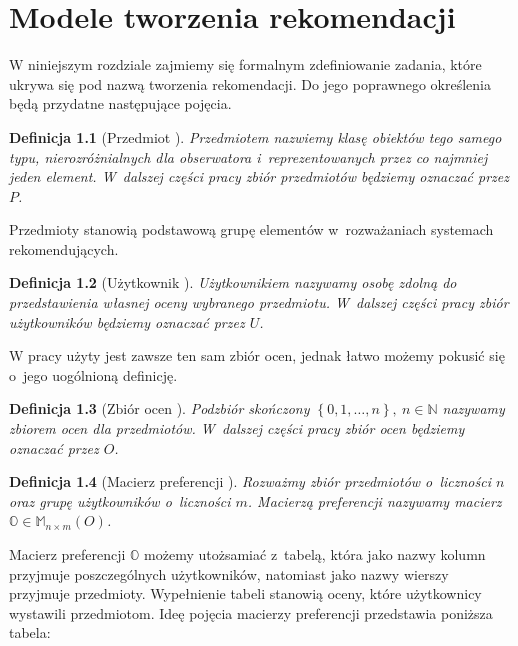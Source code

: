 \documentclass[12pt,a4paper]{report}
\newtheorem{df}{Definicja}[chapter]
\newcommand{\set}[1]{\left\lbrace {#1} \right\rbrace}
\newcommand{\setN}{\mathbb{N}}
\newcommand{\setUzytkownicy}{\mathit{U}}
\newcommand{\setPrzedmioty}{\mathit{P}}
\newcommand{\setOceny}{\mathit{O}}
\begin{document}
\chapter{Modele tworzenia rekomendacji}

W niniejszym rozdziale zajmiemy się formalnym zdefiniowanie zadania, które ukrywa się pod nazwą tworzenia rekomendacji. Do jego poprawnego określenia będą przydatne następujące pojęcia.

\begin{df}[Przedmiot {\citep[Sec 1.3]{kidzinski}}]
 Przedmiotem nazwiemy klasę obiektów tego samego typu, nierozróżnialnych dla obserwatora i~reprezentowanych przez co najmniej jeden element. W~dalszej części pracy zbiór przedmiotów będziemy oznaczać przez $\setPrzedmioty$.
\end{df}

Przedmioty stanowią podstawową grupę elementów w~rozważaniach systemach rekomendujących. 

\begin{df}[Użytkownik {\citep[Sec 1.3]{kidzinski}}]
Użytkownikiem nazywamy osobę zdolną do przedstawienia własnej oceny wybranego przedmiotu. W~dalszej części pracy zbiór użytkowników będziemy oznaczać przez $\setUzytkownicy$.
\end{df}

W pracy \citep{kidzinski} użyty jest zawsze ten sam zbiór ocen, jednak łatwo możemy pokusić się o~jego uogólnioną definicję.

\begin{df}[Zbiór ocen {\citep[Sec 1.3]{kidzinski}}]
Podzbiór skończony $\set{0,1, \ldots, n}, \: n\in \setN$ nazywamy zbiorem ocen dla przedmiotów. W~dalszej części pracy zbiór ocen będziemy oznaczać przez $\setOceny$.
\end{df} 

\begin{df}[Macierz preferencji {\citep[Sec 1.3]{kidzinski}}]
Rozważmy zbiór przedmiotów o~liczności $n$ oraz grupę użytkowników o~liczności $m$. Macierzą preferencji nazywamy macierz $\mathbb{O} \in \mathbb{M}_{n \times m}(\setOceny)$.
\end{df}

Macierz preferencji $\mathbb{O}$ możemy utożsamiać z~tabelą, która jako nazwy kolumn przyjmuje poszczególnych użytkowników, natomiast jako nazwy wierszy przyjmuje przedmioty. Wypełnienie tabeli stanowią oceny, które użytkownicy wystawili przedmiotom. Ideę pojęcia macierzy preferencji przedstawia poniższa tabela:
\end{document}
